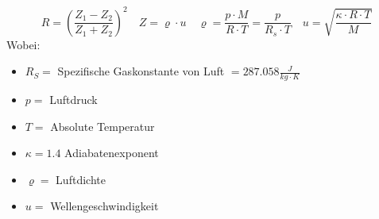 \[
	R = \left(\frac{Z_1-Z_2}{Z_1+Z_2}\right)^2 \quad Z=\varrho	\cdot u \quad \varrho = \frac{p\cdot M}{R\cdot T} = \frac{p}{R_s\cdot T} \quad u=\sqrt{\frac{\kappa \cdot R\cdot T}{M}}
\]
Wobei:\\
\begin{itemize}
\itemsep0em
\item $R_S =$ Spezifische Gaskonstante von Luft $ = 287.058\frac{J}{kg\cdot K}$\\
\item $p = $ Luftdruck
\item $T = $ Absolute Temperatur
\item $\kappa = 1.4$ Adiabatenexponent
\item $\varrho = $ Luftdichte
\item $ u = $ Wellengeschwindigkeit
\end{itemize}